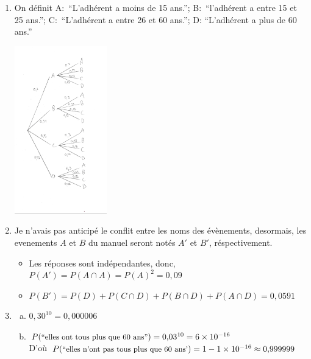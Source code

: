 \documentclass[12pt, a4paper]{article}
\begin{document}
    \begin{Exercise}[number={73}]
      \begin{enumerate}[1)]
        \item On définit A:~``L'adhérent a moins de 15 ans.''; B:~``l'adhérent a entre 15 et 25 ans.''; C:~``L'adhérent a entre 26 et 60 ans.''; D: ``L'adhérent a plus de 60 ans.'' \\\parbox{\linewidth}{
                    \centering
                    \includegraphics[width=4cm]{VAimg3.jpg}
                  } \bigbreak

        \item Je n'avais pas anticipé le conflit entre les noms des évènements, desormais, les evenements $A$ et $B$ du manuel seront notés $A'$ et $B'$, réspectivement.
              \begin{itemize}
                \item Les réponses sont indépendantes, donc, $P(A')=P(A\cap A)=P(A)^2=0{,}09$
                \item $P(B')=P(D)+P(C\cap D)+P(B\cap D)+P(A\cap D)=0{,}0591$
              \end{itemize} \medbreak
        \item \begin{enumerate}[a)]
                \item $0{,}30^{10}=0{,}000006$
                \item $P(\text{\small{``elles ont tous plus que 60 ans''}})=0{,}03^{10}=6\times 10^{-16}$ \\ D'où $P(\text{\small{``elles n'ont pas tous plus que 60 ans'}})=1-1\times 10^{-16}\approx 0{,}999999$
              \end{enumerate}
      \end{enumerate}
    \end{Exercise}
\end{document}
